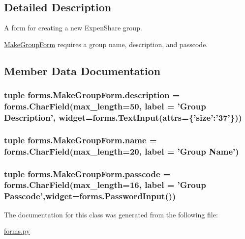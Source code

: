 \subsection{Detailed Description}
A form for creating a new Expen\-Share group. 

\hyperlink{classforms_1_1_make_group_form}{Make\-Group\-Form} requires a group name, description, and passcode. 

\subsection{Member Data Documentation}
\hypertarget{classforms_1_1_make_group_form_ad2aa4425d86ae17e396cd0dd26aead15}{
\subsubsection[{description}]{\setlength{\rightskip}{0pt plus 5cm}tuple forms.\-Make\-Group\-Form.\-description = forms.\-Char\-Field(max\-\_\-length=50, label = 'Group Description', widget=forms.\-Text\-Input(attrs=\{'size'\-:'37'\}))\hspace{0.3cm}{\ttfamily [static]}}}\label{classforms_1_1_make_group_form_ad2aa4425d86ae17e396cd0dd26aead15}
\hypertarget{classforms_1_1_make_group_form_a4d1a913bfafa1caf65dc8b658d94f2e3}{
\subsubsection[{name}]{\setlength{\rightskip}{0pt plus 5cm}tuple forms.\-Make\-Group\-Form.\-name = forms.\-Char\-Field(max\-\_\-length=20, label = 'Group Name')\hspace{0.3cm}{\ttfamily [static]}}}\label{classforms_1_1_make_group_form_a4d1a913bfafa1caf65dc8b658d94f2e3}
\hypertarget{classforms_1_1_make_group_form_a918fb02b6cb1b6e39e538ee27b42d155}{
\subsubsection[{passcode}]{\setlength{\rightskip}{0pt plus 5cm}tuple forms.\-Make\-Group\-Form.\-passcode = forms.\-Char\-Field(max\-\_\-length=16, label = 'Group Passcode',widget=forms.\-Password\-Input())\hspace{0.3cm}{\ttfamily [static]}}}\label{classforms_1_1_make_group_form_a918fb02b6cb1b6e39e538ee27b42d155}


The documentation for this class was generated from the following file\-:\begin{DoxyCompactItemize}
\item 
\hyperlink{forms_8py}{forms.\-py}\end{DoxyCompactItemize}

